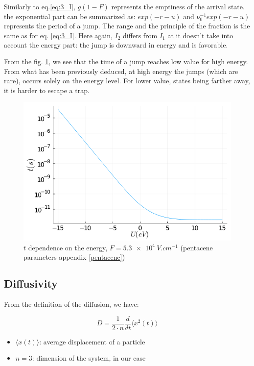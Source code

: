 Similarly to eq.\ref{eq:3_I}, $g(1 - F)$ represents the emptiness of the arrival state. the exponential part can be summarized as: $exp(-r - u)$ and $\nu_0^{-1} exp(-r - u)$ represents the period of a jump. The range and the principle of the fraction is the same as for eq. \ref{eq:3_I}. Here again, $I_2$ differs from $I_1$ at it doesn't take into account the energy part: the jump is downward in energy and is favorable.

From the fig. \ref{fig:3_10}, we see that the time of a jump reaches low value for high energy. From what has been previously deduced, at high energy the jumps (which are rare), occurs solely on the energy level. For lower value, states being farther away, it is harder to escape a trap.

\begin{figure}[!h]
    \centering
    \includegraphics*[width=.5\paperwidth]{figures/3_elec/time_u.png}
    \caption{$t$ dependence on the energy, $F = \SI{5.3e4}{V . cm^{-1}}$ (pentacene parameters appendix \ref{pentacene})\label{fig:3_10}}
\end{figure}

\subsection{Diffusivity}

From the definition of the diffusion, we have:

\begin{equation}
    D = \frac{1}{2 \cdot n} \frac{d}{d t} \langle x^2(t) \rangle
    \label{eq:3_6}
\end{equation}

\begin{itemize}
    \item $\langle x(t) \rangle$: average displacement of a particle
    \item $n = 3$: dimension of the system, in our case
\end{itemize}

